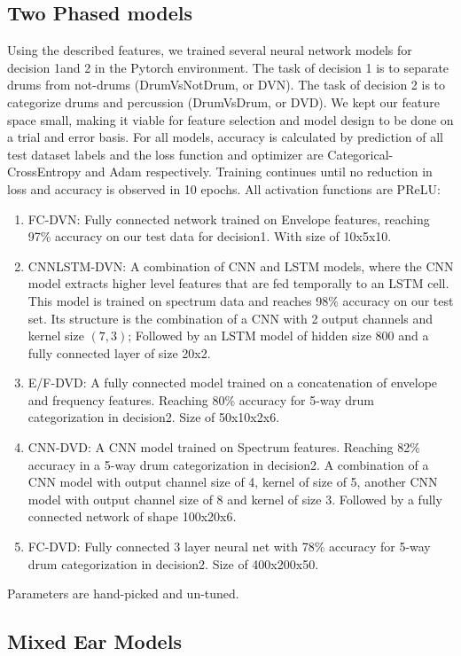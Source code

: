 \documentclass[runningheads,a4paper]{llncs}
\begin{document}
\begin{appendices}
\section{Two Phased models}
Using the described features, we trained several neural network models for  decision 1and 2 in the Pytorch environment. The task of decision 1 is to separate drums from not-drums (DrumVsNotDrum, or DVN). The task of decision 2 is to categorize drums and percussion (DrumVsDrum, or DVD). We kept our feature space small, making it viable for feature selection and model design to be done on a trial and error basis. For all models, accuracy is calculated by prediction of all test dataset labels and the loss function and optimizer are Categorical-CrossEntropy and Adam respectively. Training continues until no reduction in loss and accuracy is observed in 10 epochs.  All activation functions are PReLU:
\begin {enumerate}
\item FC-DVN: Fully connected network trained on Envelope features, reaching 97\% accuracy on our test data for decision1. With size of 10x5x10.
\item CNNLSTM-DVN: A combination of CNN and LSTM models, where the CNN model extracts higher level features that are fed temporally to an LSTM cell. This model is trained on spectrum data and reaches 98\% accuracy on our test set. Its structure is the combination of a CNN with 2 output channels and kernel size $(7,3)$; Followed by an LSTM model of hidden size 800 and a fully connected layer of size 20x2.
\item E/F-DVD: A fully connected model trained on a concatenation of envelope and frequency features. Reaching 80\% accuracy for 5-way drum categorization in decision2. Size of 50x10x2x6.
\item CNN-DVD: A CNN model trained on Spectrum features. Reaching 82\% accuracy in a 5-way drum categorization in decision2. A combination of a CNN model with output channel size of 4, kernel of size of 5, another CNN model with output channel size of 8 and kernel of size 3. Followed by a fully connected network of shape 100x20x6.
\item FC-DVD: Fully connected 3 layer neural net with 78\% accuracy for 5-way drum categorization in decision2. Size of 400x200x50.
\end{enumerate}
Parameters are hand-picked and un-tuned. 
\subsection{Mixed Ear Models}
\label{chap3:mixed_ear_models}


\end{appendices}
\end{document}
